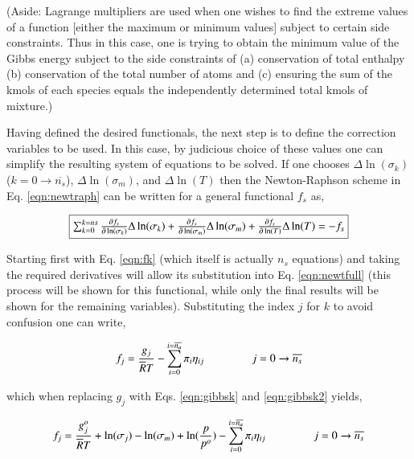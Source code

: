 	(Aside: Lagrange multipliers are
used when one wishes to find the extreme values of a function [either the maximum or minimum values] 
subject to certain side constraints.  Thus in this case, one is trying to obtain the minimum value
of the Gibbs energy subject to the side constraints of (a) conservation of total enthalpy (b) conservation
of the total number of atoms and (c) ensuring the sum of the kmols of each species equals the independently 
determined total kmols of mixture.)

	Having defined the desired functionals, the next step is to define the correction variables to be
used.  In this case, by judicious choice of these values one can simplify the resulting system
of equations to be solved.  If one chooses $\Delta \ln(\sigma_k)$ ($k = 0 \rightarrow \overline{n_s}$), 
$\Delta \ln(\sigma_m)$, and $\Delta \ln(T)$ then the Newton-Raphson scheme in Eq. \ref{eqn:newtraph} 
can be written for a general functional $f_s$ as,

\begin{equation}
	\fbox{$
	\sum_{k=0}^{k=ns}\frac{\partial f_s}{\partial \ln(\sigma_k)}\Delta \ln(\sigma_k) +
	\frac{\partial f_s}{\partial \ln(\sigma_m)}\Delta \ln(\sigma_m) + \frac{\partial f_s}
	{\partial \ln(T)}\Delta \ln(T) = - f_s	
	$}
\label{eqn:newtfull}
\end{equation}

	Starting first with Eq. \ref{eqn:fk} (which itself is actually $n_s$ equations) 
and taking the required derivatives will allow its substitution into Eq. \ref{eqn:newtfull} (this
process will be shown for this functional, while only the final results will be
shown for the remaining variables).  Substituting the index $j$ for $k$ to avoid confusion one can write,

\begin{displaymath}
	f_j = \frac{g_j}{\overline{R}T} - \sum_{i=0}^{i=\overline{n_a}}\pi_i\eta_{ij}
	\hspace{15mm}j=0\rightarrow \overline{n_s}
\end{displaymath}

	which when replacing $g_j$ with Eqs. \ref{eqn:gibbsk} and \ref{eqn:gibbsk2} yields,

\begin{displaymath}
	f_j = \frac{g_j^o}{\overline{R}T} + \ln(\sigma_j) - \ln(\sigma_m) + \ln(\frac{p}{p^o})
	- \sum_{i=0}^{i=\overline{n_a}}\pi_i\eta_{ij} \hspace{15mm}j=0\rightarrow \overline{n_s}
\end{displaymath}


